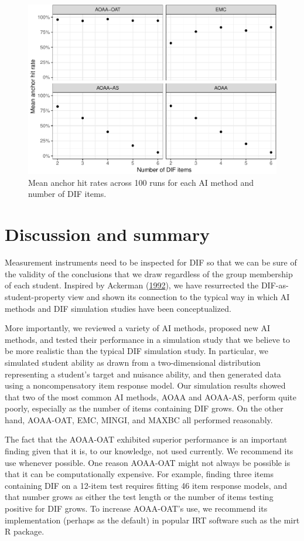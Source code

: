 \documentclass[
  11pt,
]{article}
\begin{document}
\begin{figure}[H]

{\centering \includegraphics[width=0.7\linewidth]{paper_files/figure-latex/anchorhit-1} 

}

\caption{Mean anchor hit rates across 100 runs for each AI method and number of DIF items.}\label{fig:anchorhit}
\end{figure}

\hypertarget{discussion-and-summary}{%
\section{Discussion and summary}\label{discussion-and-summary}}

Measurement instruments need to be inspected for DIF so that we can be sure of the validity of the conclusions that we draw regardless of the group membership of each student. Inspired by Ackerman (\protect\hyperlink{ref-ackerman1992didactic}{1992}), we have resurrected the DIF-as-student-property view and shown its connection to the typical way in which AI methods and DIF simulation studies have been conceptualized.

More importantly, we reviewed a variety of AI methods, proposed new AI methods, and tested their performance in a simulation study that we believe to be more realistic than the typical DIF simulation study. In particular, we simulated student ability as drawn from a two-dimensional distribution representing a student's target and nuisance ability, and then generated data using a noncompensatory item response model. Our simulation results showed that two of the most common AI methods, AOAA and AOAA-AS, perform quite poorly, especially as the number of items containing DIF grows. On the other hand, AOAA-OAT, EMC, MINGI, and MAXBC all performed reasonably.

The fact that the AOAA-OAT exhibited superior performance is an important finding given that it is, to our knowledge, not used currently. We recommend its use whenever possible. One reason AOAA-OAT might not always be possible is that it can be computationally expensive. For example, finding three items containing DIF on a 12-item test requires fitting 46 item response models, and that number grows as either the test length or the number of items testing positive for DIF grows. To increase AOAA-OAT's use, we recommend its implementation (perhaps as the default) in popular IRT software such as the mirt R package.
\end{document}
